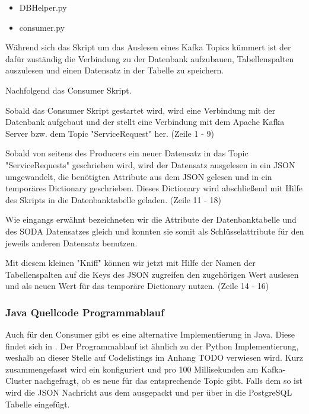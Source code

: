 \begin{itemize}
  \item DBHelper.py
  \item consumer.py
\end{itemize}

Während sich das  Skript um das Auslesen eines Kafka Topics kümmert ist der 
dafür zuständig die Verbindung zu der Datenbank aufzubauen, Tabellenspalten auszulesen und einen Datensatz in der Tabelle zu speichern.

Nachfolgend das Consumer Skript.



Sobald das Consumer Skript gestartet wird, wird eine Verbindung mit der Datenbank
aufgebaut und der  stellt eine Verbindung mit dem Apache Kafka
Server bzw. dem Topic "ServiceRequest" her.
(Zeile 1 - 9)

Sobald von seitens des Producers ein neuer Datensatz in das Topic "ServiceRequests" geschrieben wird,
wird der Datensatz ausgelesen in ein \ac{JSON} umgewandelt, die benötigten Attribute aus dem \ac{JSON} gelesen
und in ein temporäres Dictionary geschrieben.
Dieses Dictionary wird abschließend mit Hilfe des  Skripts in die
Datenbanktabelle geladen.
(Zeile 11 - 18)

Wie eingangs erwähnt bezeichneten wir die Attribute der Datenbanktabelle und des \ac{SODA} Datensatzes gleich
und konnten sie somit als Schlüsselattribute für den jeweils anderen Datensatz benutzen.

Mit diesem kleinen "Kniff" können wir jetzt mit Hilfe der Namen der Tabellenspalten
auf die Keys des \ac{JSON} zugreifen den zugehörigen Wert auslesen und als neuen Wert für das temporäre Dictionary nutzen.
(Zeile 14 - 16)

\subsubsection{Java Quellcode Programmablauf}
Auch für den Consumer gibt es eine alternative Implementierung in Java. Diese findet sich in .
Der Programmablauf ist ähnlich zu der Python Implementierung, weshalb an dieser Stelle auf Codelistings im Anhang TODO verwiesen wird.
Kurz zusammengefasst wird ein  konfiguriert und pro 100 Millisekunden am Kafka-Cluster nachgefragt, ob es neue  für das entsprechende Topic gibt.
Falls dem so ist wird die \ac{JSON} Nachricht aus dem  ausgepackt und per  über  in die PostgreSQL Tabelle eingefügt.
